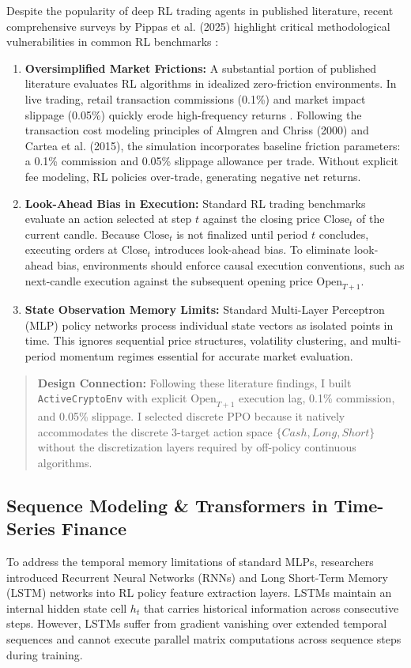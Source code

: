 \documentclass[11pt,a4paper]{article}
\newenvironment{callout}{%
  \par\vspace{8pt}
  \noindent\makebox[\linewidth]{\rule{\linewidth}{0.6pt}}\vspace{-4pt}
  \begin{quote}\small
}{%
  \end{quote}\vspace{-6pt}
  \noindent\makebox[\linewidth]{\rule{\linewidth}{0.6pt}}\vspace{8pt}
}
\begin{document}
Despite the popularity of deep RL trading agents in published literature, recent comprehensive surveys by Pippas et al. (2025) highlight critical methodological vulnerabilities in common RL benchmarks \cite{pippas2025}:
\begin{enumerate}[leftmargin=2em]
    \item \textbf{Oversimplified Market Frictions:} A substantial portion of published literature evaluates RL algorithms in idealized zero-friction environments. In live trading, retail transaction commissions (0.1\%) and market impact slippage (0.05\%) quickly erode high-frequency returns \cite{almgren2000,cartea2015}. Following the transaction cost modeling principles of Almgren and Chriss (2000) and Cartea et al. (2015), the simulation incorporates baseline friction parameters: a 0.1\% commission and 0.05\% slippage allowance per trade. Without explicit fee modeling, RL policies over-trade, generating negative net returns.
    \item \textbf{Look-Ahead Bias in Execution:} Standard RL trading benchmarks evaluate an action selected at step $t$ against the closing price $\text{Close}_t$ of the current candle. Because $\text{Close}_t$ is not finalized until period $t$ concludes, executing orders at $\text{Close}_t$ introduces look-ahead bias. To eliminate look-ahead bias, environments should enforce causal execution conventions, such as next-candle execution against the subsequent opening price $\text{Open}_{T+1}$.
    \item \textbf{State Observation Memory Limits:} Standard Multi-Layer Perceptron (MLP) policy networks process individual state vectors as isolated points in time. This ignores sequential price structures, volatility clustering, and multi-period momentum regimes essential for accurate market evaluation.
\end{enumerate}

\begin{callout}
\textbf{Design Connection:} Following these literature findings, I built \texttt{ActiveCryptoEnv} with explicit $\text{Open}_{T+1}$ execution lag, 0.1\% commission, and 0.05\% slippage. I selected discrete PPO because it natively accommodates the discrete 3-target action space $\{Cash, Long, Short\}$ without the discretization layers required by off-policy continuous algorithms.
\end{callout}

\subsection{Sequence Modeling \& Transformers in Time-Series Finance}
To address the temporal memory limitations of standard MLPs, researchers introduced Recurrent Neural Networks (RNNs) and Long Short-Term Memory (LSTM) networks into RL policy feature extraction layers. LSTMs maintain an internal hidden state cell $h_t$ that carries historical information across consecutive steps. However, LSTMs suffer from gradient vanishing over extended temporal sequences and cannot execute parallel matrix computations across sequence steps during training.
\end{document}
